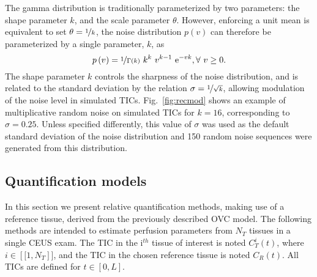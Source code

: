 The gamma distribution is traditionally parameterized by two parameters: the shape parameter $k$, and the scale parameter $\theta$.
However, enforcing a unit mean is equivalent to set $\theta = \nicefrac{1}{k}$, the noise distribution $p\left(v\right)$ can therefore be parameterized by a single parameter, $k$, as
\begin{equation}
p\left(v\right) = \nicefrac{1}{\Gamma\left(k\right)} ~ k^k ~ v^{k-1} ~ \mathrm e^{-vk}, \forall~v \geq 0.
\end{equation}
The shape parameter $k$ controls the sharpness of the noise distribution, and is related to the standard deviation by the relation $\sigma = \nicefrac{1}{\sqrt{k}}$, allowing modulation of the noise level in simulated TICs.
Fig.~\ref{fig:recmod} shows an example of multiplicative random noise on simulated TICs for $k = 16$, corresponding to $\sigma = 0.25$.
Unless specified differently, this value of $\sigma$ was used as the default standard deviation of the noise distribution and 150 random noise sequences were generated from this distribution.

\subsection{Quantification models}
In this section we present relative quantification methods, making use of a reference tissue, derived from the previously described OVC model. 
The following methods are intended to estimate perfusion parameters from $N_T$ tissues in a single CEUS exam.
The TIC in the i$^{th}$ tissue of interest is noted $C_T^i(t)$, where $i \in \left[\![1,N_T \right]\!]$, and the TIC in the chosen reference tissue is noted $C_R(t)$. All TICs are defined for $t \in \left[ 0, L \right]$.

